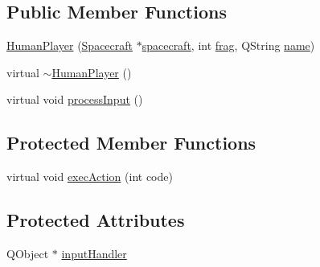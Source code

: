 \subsection*{Public Member Functions}
\begin{DoxyCompactItemize}
\item 
\hyperlink{class_human_player_a79107b832671bf80024087b4342c117f}{Human\+Player} (\hyperlink{class_spacecraft}{Spacecraft} $\ast$\hyperlink{class_player_a7cc88a054d2329b1ca7472a86b2030ca}{spacecraft}, int \hyperlink{class_player_a9528a6db252f2fe947fd7d9189837aec}{frag}, Q\+String \hyperlink{class_player_ac41b72814d9c41222dac999bc874280b}{name})
\item 
virtual \hyperlink{class_human_player_abdeb9d120fc74c8d82ec0c688883f16f}{$\sim$\+Human\+Player} ()
\item 
virtual void \hyperlink{class_human_player_a4298cb4a77be8ef79cc289baec199602}{process\+Input} ()
\end{DoxyCompactItemize}
\subsection*{Protected Member Functions}
\begin{DoxyCompactItemize}
\item 
virtual void \hyperlink{class_human_player_a1fac561ab5995308892dd237b3b32645}{exec\+Action} (int code)
\end{DoxyCompactItemize}
\subsection*{Protected Attributes}
\begin{DoxyCompactItemize}
\item 
Q\+Object $\ast$ \hyperlink{class_human_player_afac1bdc1194ebbd2236d0df12a1fb341}{input\+Handler}
\end{DoxyCompactItemize}


